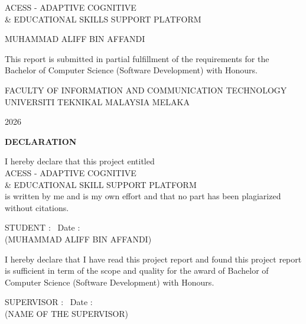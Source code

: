 \documentclass[12pt,a4paper]{report}
\begin{document}

\begin{center}

\vfill \null
\vspace{1cm}
{ACESS - ADAPTIVE COGNITIVE \\\& EDUCATIONAL SKILLS SUPPORT PLATFORM}

\vskip 1.6in
{MUHAMMAD ALIFF BIN AFFANDI}

\vskip 1.6in
This report is submitted in partial fulfillment of the requirements for the \\
Bachelor of Computer Science (Software Development) with Honours.

\vskip 1.6in
FACULTY OF INFORMATION AND COMMUNICATION TECHNOLOGY \\
UNIVERSITI TEKNIKAL MALAYSIA MELAKA
	
\vspace{2mm}	
2026

\end{center}

\newpage


\begin{center}

\vfill\null
{}
{}
\textbf{DECLARATION}

\vspace{1.5cm}
I hereby declare that this project entitled \\
ACESS - ADAPTIVE COGNITIVE \\\& EDUCATIONAL SKILL SUPPORT PLATFORM \\
is written by me and is my own effort and that no part has been plagiarized without citations.

\vspace{1.5cm}
\noindent
STUDENT \; : \underline{\hspace{8cm}} \, Date :  \underline{\hspace{2.1cm}} \\[-2mm]
(MUHAMMAD ALIFF BIN AFFANDI) \hspace{1.2cm}

\vspace{4cm}
\noindent
I hereby declare that I have read this project report and found this project report is sufficient in term of the scope and quality for the award of Bachelor of Computer Science (Software Development) with Honours.

\vspace{1.5cm}
\noindent
SUPERVISOR \; : \underline{\hspace{8cm}} \, Date :  \underline{\hspace{2.1cm}} \\[-2mm]
(NAME OF THE SUPERVISOR) \hspace{0.6cm}

\end{center}
\end{document}
